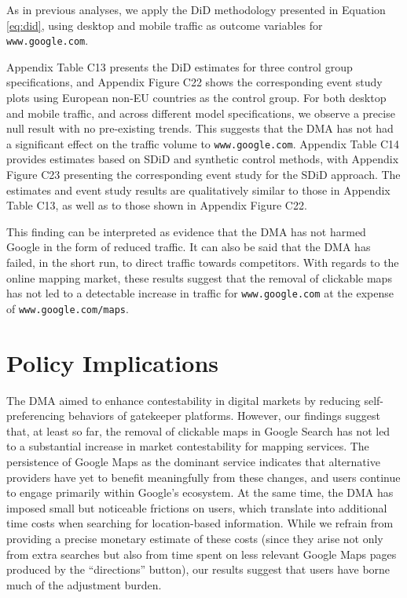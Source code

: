 \documentclass[11pt]{article}
\begin{document}
	As in previous analyses, we apply the DiD methodology presented in Equation \ref{eq:did}, using desktop and mobile traffic as outcome variables for \texttt{www.google.com}.
	
	Appendix Table C13 presents the DiD estimates for three control group specifications, and Appendix Figure C22 shows the corresponding event study plots using European non-EU countries as the control group. For both desktop and mobile traffic, and across different model specifications, we observe a precise null result with no pre-existing trends. This suggests that the DMA has not had a significant effect on the traffic volume to \texttt{www.google.com}. Appendix Table C14 provides estimates based on SDiD and synthetic control methods, with Appendix Figure C23 presenting the corresponding event study for the SDiD approach. The estimates and event study results are qualitatively similar to those in Appendix Table C13, as well as to those shown in Appendix Figure C22. 
	
	This finding can be interpreted as evidence that the DMA has not harmed Google in the form of reduced traffic. It can also be said that the DMA has failed, in the short run, to direct traffic towards competitors.  With regards to the online mapping market, these results suggest that the removal of clickable maps has not led to a detectable increase in traffic for \texttt{www.google.com} at the expense of \texttt{www.google.com/maps}.
	
	
	
	\section{Policy Implications}\label{sec:policy_impli}
	
	The DMA aimed to enhance contestability in digital markets by reducing self-preferencing behaviors of gatekeeper platforms. However, our findings suggest that, at least so far, the removal of clickable maps in Google Search has not led to a substantial increase in market contestability for mapping services. The persistence of Google Maps as the dominant service indicates that alternative providers have yet to benefit meaningfully from these changes, and users continue to engage primarily within Google’s ecosystem. At the same time, the DMA has imposed small but noticeable frictions on users, which translate into additional time costs when searching for location-based information. While we refrain from providing a precise monetary estimate of these costs (since they arise not only from extra searches but also from time spent on less relevant Google Maps pages produced by the ``directions'' button), our results suggest that users have borne much of the adjustment burden. 
	
\end{document}
